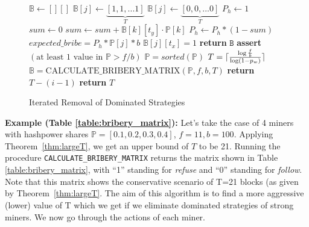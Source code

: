 \documentclass[runningheads]{llncs}
\newcommand{\refuse}{\emph{refuse}}
\newcommand{\follow}{\emph{follow}}
\DeclarePairedDelimiter\ceil{\lceil}{\rceil}
\begin{document}
\begin{subappendices}
\begin{figure}
\caption{Iterated Removal of Dominated Strategies}\label{algorithm_1}
\label{appendex:algorithm}
\begin{algorithmic}[1]
    \State $\mathbb{B} \gets [][]$ 
            \State $\mathbb{B}[j] \gets \underbrace{[1, 1, ... 1]}_{T}$
        \Else
            \State $\mathbb{B}[j] \gets \underbrace{[0, 0, ... 0]}_{T}$
                \State $P_h \gets 1$
                    \State $sum \gets 0$
                        \State $sum \gets sum + \mathbb{B}[k][t_y] \cdot \mathbb{P}[k]$
                    \EndFor
                    \State $P_h \gets P_h * (1 - sum)$
                \EndFor
                \State $expected\_bribe = P_h * \mathbb{P}[j] * b$
                    \State $\mathbb{B}[j][t_x] = 1$
                \EndIf
            \EndFor
        \EndIf
    \EndFor
    \State \textbf{return} $\mathtt{B}$
\EndProcedure
\break
{} 
    \State \textbf{assert}$(\text{at least 1 value in }\mathbb{P} > f/b)$
    \State $\mathbb{P} = sorted(\mathbb{P})$ 
    \State $T = \ceil{\frac{\log \frac{f}{b}}{\log (1-p_w)}}$ 
    \State $\mathbb{B} = \text{CALCULATE\_BRIBERY\_MATRIX}(\mathbb{P}, f, b, T)$
                \State \textbf{return} $T - (i - 1)$
            \EndIf
        \EndFor
    \EndFor
    \State \textbf{return} $T$
\EndProcedure
\end{algorithmic}
\end{figure}


\textbf{Example (Table \ref{table:bribery_matrix}):}
Let's take the case of 4 miners with hashpower shares $\mathbb{P} = [0.1, 0.2, 0.3, 0.4]$, $f = 11, b = 100$. Applying Theorem~\ref{thm:largeT}, we get an upper bound of $T$ to be 21. Running the procedure \texttt{CALCULATE\_BRIBERY\_MATRIX} returns the matrix shown in Table \ref{table:bribery_matrix}, with ``1'' standing for \refuse{} and ``0'' standing for \follow{}. Note that this matrix shows the conservative scenario of T=21 blocks (as given by Theorem~\ref{thm:largeT}. The aim of this algorithm is to find a more aggressive (lower) value of T which we get if we eliminate dominated strategies of strong miners. We now go through the actions of each miner.


\end{subappendices}
\end{document}
